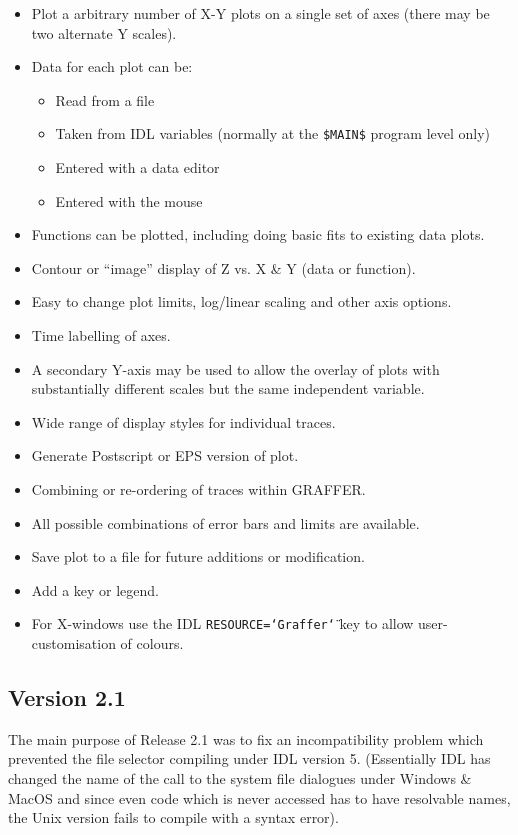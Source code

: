 \documentclass[11pt,twoside,english]{article}
\begin{document}
\begin{itemize}
\item Plot a arbitrary number of X-Y plots on a single set of axes
  (there may be two alternate Y scales).
\item Data for each plot can be:
  \begin{itemize}
  \item Read from a file
  \item Taken from IDL variables (normally at the \texttt{\$MAIN\$} program
    level only)
  \item Entered with a data editor
  \item Entered with the mouse
  \end{itemize}
\item Functions can be plotted, including doing basic fits to existing
  data plots.
\item Contour or ``image'' display of Z vs. X \& Y (data or function).
\item Easy to change plot limits, log/linear scaling and other axis
  options.
\item Time labelling of axes.
\item A secondary Y-axis may be used to allow the overlay of plots with
  substantially different scales but the same independent variable.
\item Wide range of display styles for individual traces.
\item Generate Postscript or EPS version of plot.
\item Combining or re-ordering of traces within GRAFFER.
\item All possible combinations of error bars and limits are available.
\item Save plot to a file for future additions or modification.
\item Add a key or legend.
\item For X-windows use the IDL
  \texttt{RESOURCE=\char`\"{}Graffer\char`\"{}} key to allow
  user-customisation of colours.
\end{itemize}

\subsection{Version 2.1}

The main purpose of Release 2.1 was to fix an incompatibility problem
which prevented the file selector compiling under IDL version
5. (Essentially IDL has changed the name of the call to the system file
dialogues under Windows \& MacOS and since even code which is never
accessed has to have resolvable names, the Unix version fails to
compile with a syntax error).
\end{document}
